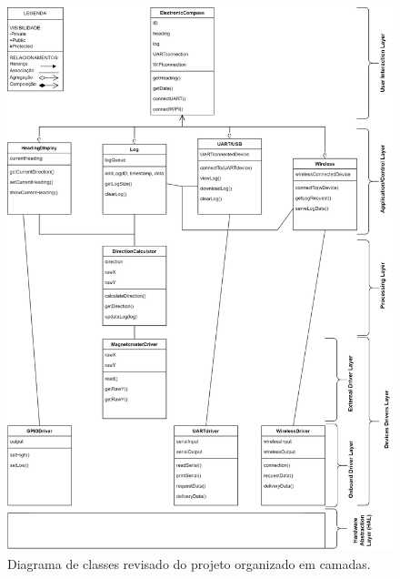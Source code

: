 \documentclass[10pt,twocolumn,letterpaper]{article}
\begin{document}

\onecolumn
{}
\label{apendice-a}
\begin{figure}[h]
  \centering
  \includegraphics[keepaspectratio=true,scale=0.53]{figures/Diagrama_Classe_Projeto_Final_rev2.png}
  \caption{Diagrama de classes revisado do projeto organizado em camadas.}
  \label{fig:diagrama-classes}
\end{figure}

\onecolumn
{}
\label{apendice-b}
\end{document}
